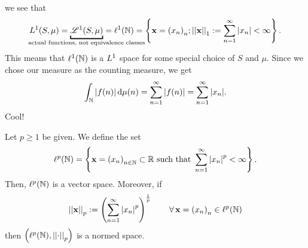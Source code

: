 \documentclass{article}
\begin{document}
we see that 
\begin{equation*}
	\Lone(S,\mu)=\underbracket{\mathscr{L}^1(S,\mu)}_{\mathclap{\text{actual functions, not equivalence classes}}}=\ell^1(\N)=\left\{\mathbf{x}={(x_{n})}_{n};\norm{\mathbf{x}}_{1}:=\sum_{n=1}^{\infty}|x_n|<\infty\right\}.
\end{equation*} 
This means that $\ell^1(\mathbb{N})$ is a $L^{1}$ space for some special choice of $S$ and $\mu$. Since we chose our measure as the counting measure, we get
\begin{equation*}
	\int_{\mathbb{N}}|f(n)|\mathop{}\!\mathrm{d}\mu(n)=\sum_{n=1}^\infty|f(n)|=\sum_{n=1}^\infty|x_n|.
\end{equation*}
Cool!
\begin{proposition}
	Let $p\geq1$ be given. We define the set
	\begin{equation*}
		\ell^p(\mathbb{N})=\left\{\mathbf{x}={(x_{n})}_{n\in\mathbb{N}}\subset\mathbb{R}\text{ such that }\sum_{n=1}^\infty\left|x_n\right|^{p}<\infty\right\}.
	\end{equation*}
	Then, $\ell^p(\mathbb{N})$ is a vector space. Moreover, if
	\begin{equation*}
		\left|\left|\mathbf{x}\right|\right|_{p}:=\left(\sum_{n=1}^\infty\left|x_n\right|^p\right)^{\frac{1}{p}}\qquad\forall\,\mathbf{x}={(x_{n})}_{n}\in\ell^p(\mathbb{N})
	\end{equation*}
	then $\left(\ell^p(\mathbb{N}),\left|\left|\cdot\right|\right|_p\right)$ is a normed space.
\end{proposition}
\end{document}
